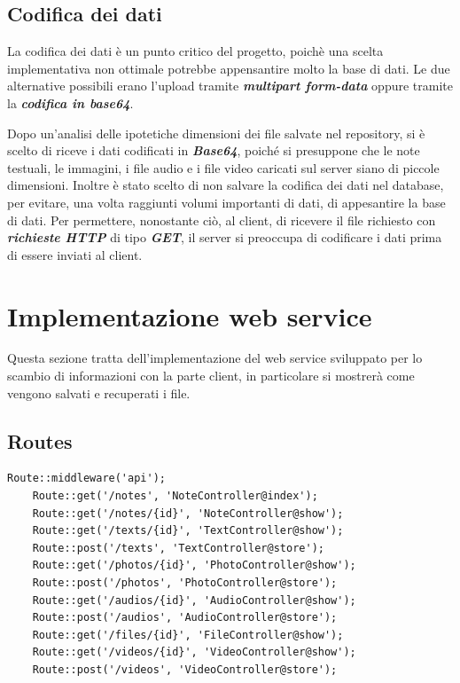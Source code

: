 \subsection{Codifica dei dati}
La codifica dei dati è un punto critico del progetto, poichè una scelta implementativa non ottimale potrebbe appensantire molto la base di dati.
Le due alternative possibili erano l'upload tramite \textit{\textbf{multipart form-data}} oppure tramite la \textit{\textbf{codifica in base64}}.

Dopo un'analisi delle ipotetiche dimensioni dei file salvate nel repository, si è scelto di riceve i dati codificati in \textit{\textbf{Base64}}, poiché si presuppone che le note testuali, le immagini, i file audio e i file video caricati sul server siano di piccole dimensioni.
Inoltre è stato scelto di non salvare la codifica dei dati nel database, per evitare, una volta raggiunti volumi importanti di dati, di appesantire la base di dati.
Per permettere, nonostante ciò, al client, di ricevere il file richiesto con \textit{\textbf{richieste HTTP}} di tipo \textit{\textbf{GET}}, il server si preoccupa di codificare i dati prima di essere inviati al client.

\pagebreak
\section{Implementazione web service}

Questa sezione tratta dell'implementazione del web service sviluppato per lo scambio di informazioni con la parte client, in particolare si mostrerà come vengono salvati e recuperati i file.

\subsection{Routes}

\begin{lstlisting}[caption={Definizione routes}, label={lst:RoutesDef}]
	Route::middleware('api');
	Route::get('/notes', 'NoteController@index');
	Route::get('/notes/{id}', 'NoteController@show');
	Route::get('/texts/{id}', 'TextController@show');
	Route::post('/texts', 'TextController@store');
	Route::get('/photos/{id}', 'PhotoController@show');
	Route::post('/photos', 'PhotoController@store');
	Route::get('/audios/{id}', 'AudioController@show');
	Route::post('/audios', 'AudioController@store');
	Route::get('/files/{id}', 'FileController@show');
	Route::get('/videos/{id}', 'VideoController@show');
	Route::post('/videos', 'VideoController@store');
\end{lstlisting}

